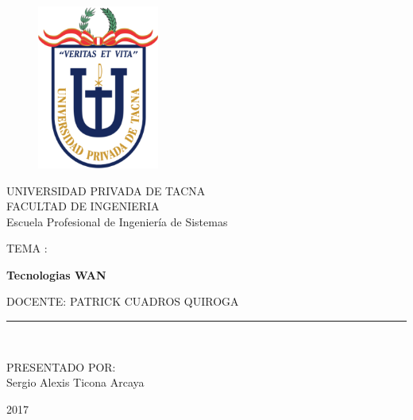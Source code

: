 \documentclass[a4paper,openright,12pt]{report}
\begin{document}
\begin{titlepage}
\begin{center}
\vspace*{-1in}
\begin{figure}[htb]
\begin{center}
\includegraphics[width=4cm]{./images/upt}
\end{center}
\end{figure}

UNIVERSIDAD PRIVADA DE TACNA\\
\vspace*{0.15in}
FACULTAD DE INGENIERIA\\
Escuela Profesional de Ingeniería de Sistemas\\
\vspace*{0.6in}
\begin{large}
TEMA : \\
\end{large}
\vspace*{0.2in}
\begin{Large}
\textbf{Tecnologias WAN} \\
\end{Large}
\vspace*{0.3in}
\begin{large}
DOCENTE: PATRICK CUADROS QUIROGA\\
\end{large}
\vspace*{0.3in}
\rule{80mm}{0.1mm}\\
\vspace*{0.1in}
\begin{large}
PRESENTADO POR: \\
Sergio Alexis Ticona Arcaya\\
\end{large}
\vspace*{2in}
\begin{large}
2017\\
\end{large}
\end{center}
\tableofcontents
\begin{large}

\end{large}
\end{titlepage}
\end{document}
